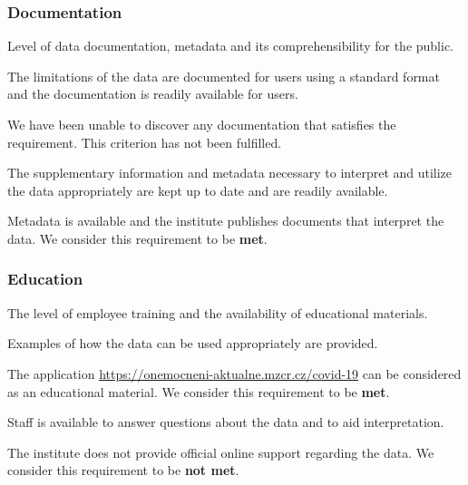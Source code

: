 \subsubsection{Documentation}

Level of data documentation, metadata and its comprehensibility for the public.

\begin{QandA}
    \item The limitations of the data are documented for users using a standard format and the documentation is readily available for users.
    \begin{answered}
        We have been unable to discover any documentation that satisfies the requirement.
        This criterion has not been fulfilled.
    \end{answered}

    \item The supplementary information and metadata necessary to interpret and utilize the data appropriately are kept up to date and are readily available.
    \begin{answered}
        Metadata is available and the institute publishes documents that interpret the data.
        We consider this requirement to be \textbf{met}.
    \end{answered}

\end{QandA}

\subsubsection{Education}

The level of employee training and the availability of educational materials.

\begin{QandA}
    \item Examples of how the data can be used appropriately are provided.
    \begin{answered}
        The application \url{https://onemocneni-aktualne.mzcr.cz/covid-19} can be considered as an educational material.
        We consider this requirement to be \textbf{met}.
    \end{answered}

    \item Staff is available to answer questions about the data and to aid interpretation.
    \begin{answered}
        The institute does not provide official online support regarding the data.
        We consider this requirement to be \textbf{not met}.
    \end{answered}

\end{QandA}

